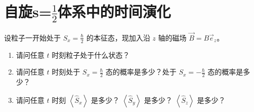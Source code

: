\documentclass[lang=cn,15pt]{elegantbook}
\begin{document}
\section{自旋s=$\frac{1}{2}$体系中的时间演化}
\begin{example}
	设粒子一开始处于 $S_x = \frac{\hbar}{2}$ 的本征态，现加入沿 $z$ 轴的磁场 $\vec{B} = B \vec{e}_z$。
	
	\begin{enumerate}
		\item 请问任意 $t$ 时刻粒子处于什么状态？
		\item 请问任意 $t$ 时刻处于 $S_x = \frac{\hbar}{2}$ 态的概率是多少？处于 $S_x = -\frac{\hbar}{2}$ 态的概率是多少？
		\item 请问任意 $t$ 时刻 $\left\langle \hat{S}_x \right\rangle$ 是多少？ $\left\langle \hat{S}_y \right\rangle$ 是多少？ $\left\langle \hat{S}_z \right\rangle$ 是多少？
	\end{enumerate}
\end{example}
\end{document}
